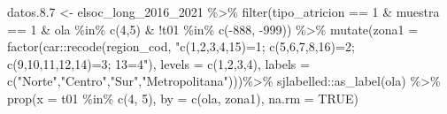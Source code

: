 \documentclass[
  12pt,
]{book}
\newenvironment{Shaded}{\begin{snugshade}}{\end{snugshade}}
\newcommand{\AttributeTok}[1]{\textcolor[rgb]{0.77,0.63,0.00}{#1}}
\newcommand{\ConstantTok}[1]{\textcolor[rgb]{0.00,0.00,0.00}{#1}}
\newcommand{\DecValTok}[1]{\textcolor[rgb]{0.00,0.00,0.81}{#1}}
\newcommand{\FloatTok}[1]{\textcolor[rgb]{0.00,0.00,0.81}{#1}}
\newcommand{\FunctionTok}[1]{\textcolor[rgb]{0.00,0.00,0.00}{#1}}
\newcommand{\NormalTok}[1]{#1}
\newcommand{\OtherTok}[1]{\textcolor[rgb]{0.56,0.35,0.01}{#1}}
\newcommand{\SpecialCharTok}[1]{\textcolor[rgb]{0.00,0.00,0.00}{#1}}
\newcommand{\StringTok}[1]{\textcolor[rgb]{0.31,0.60,0.02}{#1}}
\begin{document}
\begin{Shaded}
\begin{Highlighting}[]
\NormalTok{datos.}\FloatTok{8.7} \OtherTok{\textless{}{-}}\NormalTok{ elsoc\_long\_2016\_2021 }\SpecialCharTok{\%\textgreater{}\%} 
  \FunctionTok{filter}\NormalTok{(tipo\_atricion }\SpecialCharTok{==} \DecValTok{1} \SpecialCharTok{\&}\NormalTok{ muestra }\SpecialCharTok{==} \DecValTok{1} \SpecialCharTok{\&}\NormalTok{ ola }\SpecialCharTok{\%in\%} \FunctionTok{c}\NormalTok{(}\DecValTok{4}\NormalTok{,}\DecValTok{5}\NormalTok{) }\SpecialCharTok{\&} \SpecialCharTok{!}\NormalTok{t01 }\SpecialCharTok{\%in\%} \FunctionTok{c}\NormalTok{(}\SpecialCharTok{{-}}\DecValTok{888}\NormalTok{, }\SpecialCharTok{{-}}\DecValTok{999}\NormalTok{)) }\SpecialCharTok{\%\textgreater{}\%} 
  \FunctionTok{mutate}\NormalTok{(}\AttributeTok{zona1 =} \FunctionTok{factor}\NormalTok{(car}\SpecialCharTok{::}\FunctionTok{recode}\NormalTok{(region\_cod, }
                                    \StringTok{"c(1,2,3,4,15)=1; c(5,6,7,8,16)=2; c(9,10,11,12,14)=3; 13=4"}\NormalTok{),}
                        \AttributeTok{levels =} \FunctionTok{c}\NormalTok{(}\DecValTok{1}\NormalTok{,}\DecValTok{2}\NormalTok{,}\DecValTok{3}\NormalTok{,}\DecValTok{4}\NormalTok{), }
                        \AttributeTok{labels =} \FunctionTok{c}\NormalTok{(}\StringTok{"Norte"}\NormalTok{,}\StringTok{"Centro"}\NormalTok{,}\StringTok{"Sur"}\NormalTok{,}\StringTok{"Metropolitana"}\NormalTok{)))}\SpecialCharTok{\%\textgreater{}\%}
\NormalTok{  sjlabelled}\SpecialCharTok{::}\FunctionTok{as\_label}\NormalTok{(ola) }\SpecialCharTok{\%\textgreater{}\%}
  \FunctionTok{prop}\NormalTok{(}\AttributeTok{x =}\NormalTok{ t01 }\SpecialCharTok{\%in\%} \FunctionTok{c}\NormalTok{(}\DecValTok{4}\NormalTok{, }\DecValTok{5}\NormalTok{), }\AttributeTok{by =} \FunctionTok{c}\NormalTok{(ola, zona1), }\AttributeTok{na.rm =} \ConstantTok{TRUE}\NormalTok{) }


\end{Highlighting}
\end{Shaded}
\end{document}
